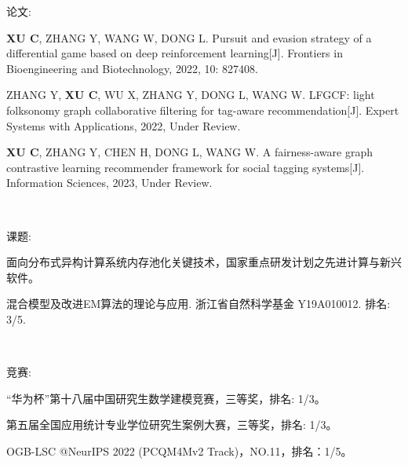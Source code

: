 \newpage
\pagestyle{fancy}
\begin{center}
\heiti{}
\end{center}


论文:

\textbf{XU C}, ZHANG Y, WANG W, DONG L. Pursuit and evasion strategy of a differential game based on deep reinforcement learning[J]. Frontiers in Bioengineering and Biotechnology, 2022, 10: 827408.

ZHANG Y, \textbf{XU C}, WU X, ZHANG Y, DONG L, WANG W. LFGCF: light folksonomy graph collaborative filtering for tag-aware recommendation[J]. Expert Systems with Applications, 2022, Under Review.

\textbf{XU C}, ZHANG Y, CHEN H, DONG L, WANG W. A fairness-aware graph contrastive learning recommender framework for social tagging systems[J]. Information Sciences, 2023, Under Review.

\

课题:

面向分布式异构计算系统内存池化关键技术，国家重点研发计划之先进计算与新兴软件。

混合模型及改进EM算法的理论与应用. 浙江省自然科学基金 Y19A010012. 排名: 3/5.

\

竞赛:

“华为杯”第十八届中国研究生数学建模竞赛，三等奖，排名: 1/3。

第五届全国应用统计专业学位研究生案例大赛，三等奖，排名: 1/3。

OGB-LSC @NeurIPS 2022 (PCQM4Mv2 Track)，NO.11，排名：1/5。